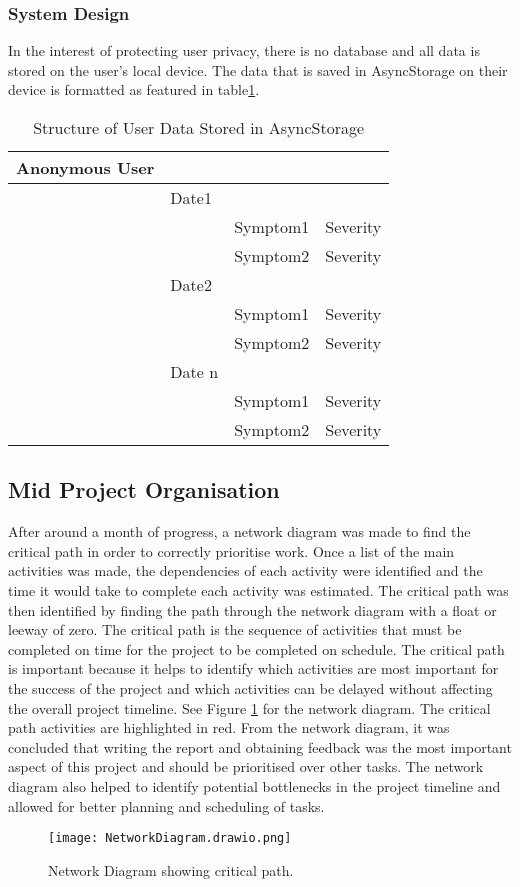 \subsubsection{System Design}
In the interest of protecting user privacy, there is no database and all data is stored on the user's local device. The data that is saved in AsyncStorage on their device is formatted as featured in table\ref{table:user-data}.

\begin{table}[h!!]
    \caption{Structure of User Data Stored in AsyncStorage}
    \label{table:user-data}
    \begin{tabular}{llll}
    \hline
    Anonymous User &        &          &          \\ \hline
                  & Date1  &          &          \\
                  &        & Symptom1 & Severity \\
                  &        & Symptom2 & Severity \\
                  & Date2  &          &          \\
                  &        & Symptom1 & Severity \\
                  &        & Symptom2 & Severity \\
                  & Date n &          &          \\
                  &        & Symptom1 & Severity \\
                  &        & Symptom2 & Severity \\ \hline
  \end{tabular}
\end{table}


\subsection{Mid Project Organisation}

After around a month of progress, a network diagram was made to find the critical path in order to correctly prioritise work. Once a list of the main activities was made, the dependencies of each activity were identified and the time it would take to complete each activity was estimated. The critical path was then identified by finding the path through the network diagram with a float or leeway of zero. The critical path is the sequence of activities that must be completed on time for the project to be completed on schedule. The critical path is important because it helps to identify which activities are most important for the success of the project and which activities can be delayed without affecting the overall project timeline. See Figure \ref{figure:network-diagram} for the network diagram. The critical path activities are highlighted in red. From the network diagram, it was concluded that writing the report and obtaining feedback was the most important aspect of this project and should be prioritised over other tasks. The network diagram also helped to identify potential bottlenecks in the project timeline and allowed for better planning and scheduling of tasks.

\begin{figure}[h!!]
  \begin{center}
    \texttt{[image: NetworkDiagram.drawio.png]}
    \caption{Network Diagram showing critical path.}
    \label{figure:network-diagram}
  \end{center}
\end{figure}